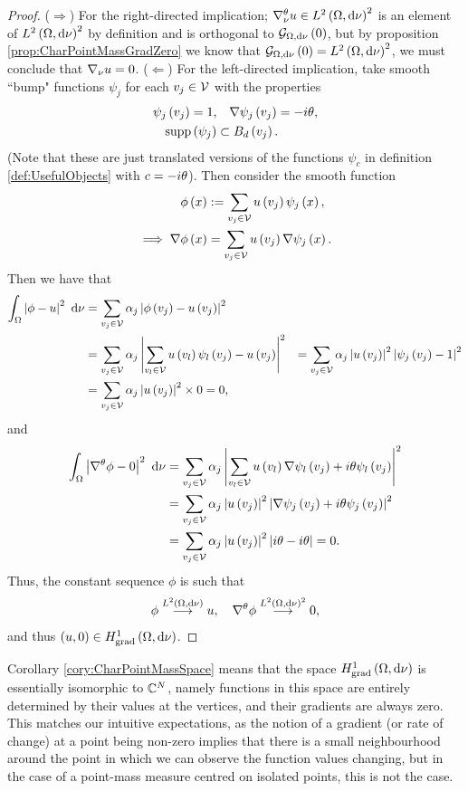 \begin{proof}
	($\Rightarrow$) For the right-directed implication; $\nabla^{\theta}_{\nu}u\in L^{2}\left( \Omega,\mathrm{d}\nu \right)^2$ is an element of $L^{2}\left( \Omega,\mathrm{d}\nu \right)^2$ by definition and is orthogonal to $\mathcal{G}_{ \Omega, \mathrm{d}\nu}\left( 0 \right)$, but by proposition \ref{prop:CharPointMassGradZero} we know that $\mathcal{G}_{ \Omega, \mathrm{d}\nu}\left( 0 \right)=L^{2}\left( \Omega,\mathrm{d}\nu \right)^2$, we must conclude that $\nabla_{\nu}u = 0$. \newline
	($\Leftarrow$) For the left-directed implication, take smooth ``bump" functions $\psi_j$ for each $v_j\in\mathcal{V}$ with the properties
	\begin{align*}
		\psi_j\left( v_j \right) = 1, &\quad \nabla\psi_j\left( v_j \right) = -i\theta, \\
		\mathrm{supp}\left( \psi_j \right) &\subset B_{d}\left( v_j \right).
	\end{align*}
	(Note that these are just translated versions of the functions $\psi_c$ in definition \ref{def:UsefulObjects} with $c=-i\theta$).
	Then consider the smooth function
	\begin{align*}
		\phi\left( x \right) &:= \sum_{v_j\in\mathcal{V}} u\left( v_j \right)\psi_j\left( x \right), \\
		\implies \nabla\phi\left( x \right) &= \sum_{v_j\in\mathcal{V}} u\left( v_j \right)\nabla\psi_j\left( x \right).
	\end{align*}
	Then we have that
	\begin{align*}
		\int_{\Omega}\left\lvert \phi - u \right\rvert^2 \ \mathrm{d}\nu &= \sum_{v_j\in\mathcal{V}} \alpha_j\left\lvert \phi\left( v_j \right) - u\left( v_j \right) \right\rvert^2 \\
		&= \sum_{v_j\in\mathcal{V}} \alpha_j\left\lvert  \sum_{v_l\in\mathcal{V}}u\left( v_l \right)\psi_l\left( v_j \right) - u\left( v_j \right)  \right\rvert^2
		&= \sum_{v_j\in\mathcal{V}} \alpha_j\left\lvert u\left( v_j \right) \right\rvert^2\left\lvert \psi_j\left( v_j \right)-1 \right\rvert^2 \\
		&= \sum_{v_j\in\mathcal{V}} \alpha_j\left\lvert u\left( v_j \right) \right\rvert^2 \times 0 = 0,
	\end{align*}
	and
	\begin{align*}
		\int_{\Omega}\left\lvert \nabla^{\theta}\phi - 0 \right\rvert^2 \ \mathrm{d}\nu 
		&= \sum_{v_j\in\mathcal{V}} \alpha_j\left\lvert  \sum_{v_l\in\mathcal{V}} u\left( v_l \right)\nabla\psi_l\left( v_j \right) + i\theta\psi_l\left( v_j \right)  \right\rvert^2 \\
		&= \sum_{v_j\in\mathcal{V}} \alpha_j\left\lvert u\left( v_j \right) \right\rvert^2 \left\lvert  \nabla\psi_j\left( v_j \right) + i\theta\psi_j\left( v_j \right)  \right\rvert^2 \\
		&= \sum_{v_j\in\mathcal{V}} \alpha_j\left\lvert u\left( v_j \right) \right\rvert^2 \left\lvert  i\theta - i\theta  \right\rvert = 0.
	\end{align*}
	Thus, the constant sequence $\phi$ is such that
	\begin{align*}
		\phi \overset{L^{2}\left( \Omega,\mathrm{d}\nu \right)}{\longrightarrow} u, \quad \nabla^{\theta}\phi \overset{L^{2}\left( \Omega,\mathrm{d}\nu \right)^2}{\longrightarrow} 0,
	\end{align*}
	and thus $\left( u,0 \right)\in H^1_\mathrm{grad}\left( \Omega, \mathrm{d}\nu \right)$.
\end{proof}
Corollary \ref{cory:CharPointMassSpace} means that the space $H^1_\mathrm{grad}\left( \Omega, \mathrm{d}\nu \right)$ is essentially isomorphic to $\mathbb{C}^N$, namely functions in this space are entirely determined by their values at the vertices, and their gradients are always zero.
This matches our intuitive expectations, as the notion of a gradient (or rate of change) at a point being non-zero implies that there is a small neighbourhood around the point in which we can observe the function values changing, but in the case of a point-mass measure centred on isolated points, this is not the case.